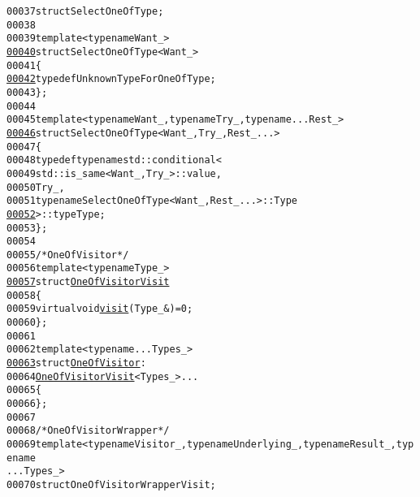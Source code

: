 \begin{footnotesize}
\begin{alltt}
00037     \textcolor{keyword}{struct }SelectOneOfType;
00038 
00039     \textcolor{keyword}{template} <\textcolor{keyword}{typename} Want\_>
\hypertarget{one-of_8hh_source_l00040}{}\hyperlink{structeos_1_1SelectOneOfType_3_01Want___01_4}{00040}     \textcolor{keyword}{struct }SelectOneOfType<Want\_>
00041     \{
\hypertarget{one-of_8hh_source_l00042}{}\hyperlink{structeos_1_1SelectOneOfType_3_01Want___01_4_aa89f45e51d938a8ec8bf5bbfc41bafbc}{00042}         \textcolor{keyword}{typedef} UnknownTypeForOneOf Type;
00043     \};
00044 
00045     \textcolor{keyword}{template} <\textcolor{keyword}{typename} Want\_, \textcolor{keyword}{typename} Try\_, \textcolor{keyword}{typename} ... Rest\_>
\hypertarget{one-of_8hh_source_l00046}{}\hyperlink{structeos_1_1SelectOneOfType_3_01Want___00_01Try___00_01Rest___8_8_8_4}{00046}     \textcolor{keyword}{struct }SelectOneOfType<Want\_, Try\_, Rest\_ ...>
00047     \{
00048         \textcolor{keyword}{typedef} \textcolor{keyword}{typename} std::conditional<
00049             std::is\_same<Want\_, Try\_>::value,
00050             Try\_,
00051             \textcolor{keyword}{typename} SelectOneOfType<Want\_, Rest\_ ...>::Type
\hypertarget{one-of_8hh_source_l00052}{}\hyperlink{structeos_1_1SelectOneOfType_3_01Want___00_01Try___00_01Rest___8_8_8_4_a740264f972731bf06d91d7ced803db0a}{00052}                 >::type Type;
00053     \};
00054 
00055     \textcolor{comment}{/* OneOfVisitor */}
00056     \textcolor{keyword}{template} <\textcolor{keyword}{typename} Type\_>
\hypertarget{one-of_8hh_source_l00057}{}\hyperlink{structeos_1_1OneOfVisitorVisit}{00057}     \textcolor{keyword}{struct }\hyperlink{structeos_1_1OneOfVisitorVisit}{OneOfVisitorVisit}
00058     \{
00059         \textcolor{keyword}{virtual} \textcolor{keywordtype}{void} \hyperlink{structeos_1_1OneOfVisitorVisit_a08f9e17fa9f510ba6171d6b191e76a9b}{visit}(Type\_ &) = 0;
00060     \};
00061 
00062     \textcolor{keyword}{template} <\textcolor{keyword}{typename} ... Types\_>
\hypertarget{one-of_8hh_source_l00063}{}\hyperlink{structeos_1_1OneOfVisitor}{00063}     \textcolor{keyword}{struct }\hyperlink{structeos_1_1OneOfVisitor}{OneOfVisitor} :
00064         \hyperlink{structeos_1_1OneOfVisitorVisit}{OneOfVisitorVisit}<Types\_> ...
00065     \{
00066     \};
00067 
00068     \textcolor{comment}{/* OneOfVisitorWrapper */}
00069     \textcolor{keyword}{template} <\textcolor{keyword}{typename} Visitor\_, \textcolor{keyword}{typename} Underlying\_, \textcolor{keyword}{typename} Result\_, \textcolor{keyword}{typename
      } ... Types\_>
00070     \textcolor{keyword}{struct }OneOfVisitorWrapperVisit;

\end{alltt}
\end{footnotesize}
